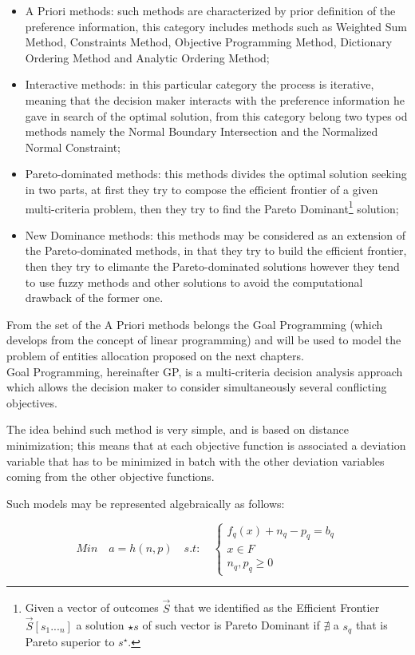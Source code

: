 \documentclass{article}
\begin{document}
\begin{itemize}
	\item A Priori methods: such methods are characterized by prior definition of the preference information, this category includes methods such as Weighted Sum Method, Constraints Method, Objective Programming Method, Dictionary Ordering Method and Analytic Ordering Method;   
	\item Interactive methods: in this particular category the process is iterative, meaning that the decision maker interacts with the preference information he gave in search of the optimal solution, from this category belong two types od methods namely the Normal Boundary Intersection and the Normalized Normal Constraint;
	\item Pareto-dominated methods: this methods divides the optimal solution seeking in two parts, at first they try to compose the efficient frontier of a given multi-criteria problem, then they try to find the Pareto Dominant\footnote{Given a vector of outcomes $\vec{S}$ that we identified as the Efficient Frontier $\vec{S}[s_1..._n]$ a solution $\star{s}$ of such vector is Pareto Dominant if $\nexists$ a $s_q$ that is Pareto superior to $s^{\star}$.} solution;
	\item New Dominance methods: this methods may be considered as an extension of the Pareto-dominated methods, in that they try to build the efficient frontier, then they try to elimante the Pareto-dominated solutions however they tend to use fuzzy methods and other solutions to avoid the computational drawback of the former one.  
\end{itemize}

From the set of the A Priori methods belongs the Goal Programming (which develops from the concept of linear programming) and will be used to model the problem of entities allocation proposed on the next chapters.
\\
Goal Programming, hereinafter GP, is a multi-criteria decision analysis approach which allows the decision maker to consider simultaneously several conflicting objectives.

The idea behind such method is very simple, and is based on distance minimization; this means that at each objective function is associated a deviation variable that has to be minimized in batch with the other deviation variables coming from the other objective functions.

Such models may be represented algebraically as follows:

\[
Min \quad a=h(n,p) \quad s.t: \quad
\begin{cases}
f_q(x)+n_q-p_q=b_q \\
x\in F \\
n_q,p_q\geq 0
\end{cases}
\]
\end{document}
